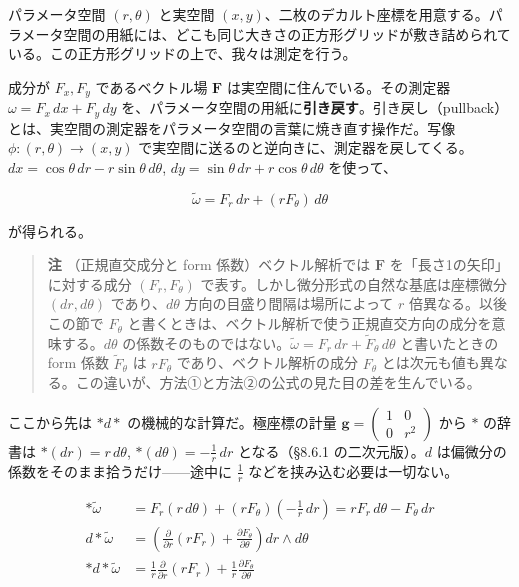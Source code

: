 \documentclass[a4paper,12pt,openany]{book}
\begin{document}
パラメータ空間 \((r,\theta)\) と実空間
\((x,y)\)、二枚のデカルト座標を用意する。パラメータ空間の用紙には、どこも同じ大きさの正方形グリッドが敷き詰められている。この正方形グリッドの上で、我々は測定を行う。

成分が \(F_x,F_y\) であるベクトル場 \(\mathbf{F}\)
は実空間に住んでいる。その測定器 \(\omega = F_x\,dx + F_y\,dy\)
を、パラメータ空間の用紙に\textbf{引き戻す}。引き戻し（pullback）とは、実空間の測定器をパラメータ空間の言葉に焼き直す操作だ。写像
\(\phi: (r,\theta) \to (x,y)\)
で実空間に送るのと逆向きに、測定器を戻してくる。\(dx = \cos\theta\,dr - r\sin\theta\,d\theta\),
\(dy = \sin\theta\,dr + r\cos\theta\,d\theta\) を使って、

\[\tilde{\omega} = F_r\,dr + (r F_\theta)\,d\theta\]

が得られる。

\begin{quote}
\textbf{注} （正規直交成分と form 係数）ベクトル解析では \(\mathbf{F}\)
を「長さ1の矢印」に対する成分 \((F_r, F_\theta)\)
で表す。しかし微分形式の自然な基底は座標微分 \((dr, d\theta)\)
であり、\(d\theta\) 方向の目盛り間隔は場所によって \(r\)
倍異なる。以後この節で \(F_\theta\)
と書くときは、ベクトル解析で使う正規直交方向の成分を意味する。\(d\theta\)
の係数そのものではない。\(\tilde{\omega} = F_r\,dr + \tilde{F}_\theta\,d\theta\)
と書いたときの form 係数 \(\tilde{F}_\theta\) は \(r F_\theta\)
であり、ベクトル解析の成分 \(F_\theta\)
とは次元も値も異なる。この違いが、方法①と方法②の公式の見た目の差を生んでいる。
\end{quote}

ここから先は \(\ast d\ast\) の機械的な計算だ。極座標の計量
\(\mathbf{g} = \begin{pmatrix} 1 & 0 \\ 0 & r^2 \end{pmatrix}\) から
\(\ast\) の辞書は \(\ast(dr) = r\,d\theta\),
\(\ast(d\theta) = -\frac{1}{r}\,dr\) となる（§8.6.1 の二次元版）。\(d\)
は偏微分の係数をそのまま拾うだけ——途中に \(\frac{1}{r}\)
などを挟み込む必要は一切ない。

\[\begin{aligned}
\ast\tilde{\omega} &= F_r(r\,d\theta) + (r F_\theta)\!\left(-\frac{1}{r}\,dr\right) = r F_r\,d\theta - F_\theta\,dr \\[0.3em]
d\ast\tilde{\omega} &= \left(\frac{\partial}{\partial r}(r F_r) + \frac{\partial F_\theta}{\partial \theta}\right) dr \wedge d\theta \\[0.3em]
\ast d\ast\tilde{\omega} &= \frac{1}{r}\frac{\partial}{\partial r}(r F_r) + \frac{1}{r}\frac{\partial F_\theta}{\partial \theta}
\end{aligned}\]
\end{document}
